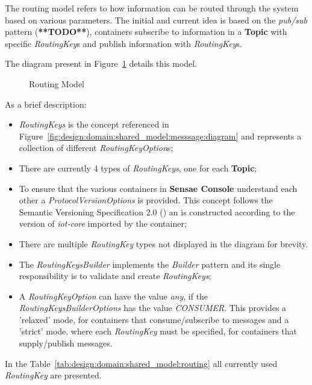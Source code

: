 The routing model refers to how information can be routed through the system based on various parameters. The initial and current idea is based on the \textit{pub/sub} pattern (\textbf{**TODO**}), containers subscribe to information in a \textbf{Topic} with specific \textit{RoutingKey}s and publish information with \textit{RoutingKey}s.

The diagram present in Figure~\ref{fig:design:domain:shared_model:routing:diagram} details this model.

\begin{figure}[H]
   \centering
  \resizebox{\columnwidth}{!}
  {
     
  }
  \caption[Routing Model]{Routing Model}
  \label{fig:design:domain:shared_model:routing:diagram}
\end{figure}

As a brief description:

\begin{itemize}
   \item \textit{RoutingKeys} is the concept referenced in Figure~\ref{fig:design:domain:shared_model:messsage:diagram} and represents a collection of different \textit{RoutingKeyOption}s;
   \item There are currently 4 types of \textit{RoutingKeys}, one for each \textbf{Topic};
   \item To ensure that the various containers in \textbf{Sensae Console} understand each other a \textit{ProtocolVersionOptions} is provided. This concept follows the Semantic Versioning Specification 2.0 (\cite{semver}) an is constructed according to the version of \textit{iot-core} imported by the container;
   \item There are multiple \textit{RoutingKey} types not displayed in the diagram for brevity.
   \item The \textit{RoutingKeysBuilder} implements the \textit{Builder} pattern and its single responsibility is to validate and create \textit{RoutingKeys};
   \item A \textit{RoutingKeyOption} can have the value \textit{any}, if the \textit{RoutingKeysBuilderOptions} has the value \textit{CONSUMER}. This provides a 'relaxed' mode, for containers that consume/subscribe to messages and a 'strict' mode, where each \textit{RoutingKey} must be specified, for containers that supply/publish messages. 
\end{itemize}

In the Table~\ref{tab:design:domain:shared_model:routing} all currently used \textit{RoutingKey} are presented.

